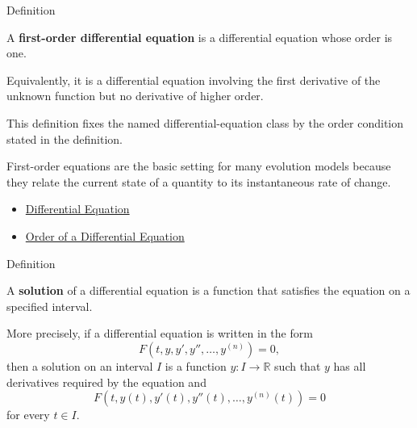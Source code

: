 
\begin{definitionbox}{Definition}
\begin{definition}
\label{def:ordinary-differential-equations-terminology-first-order-differential-equation}
A \textbf{first-order differential equation} is a differential equation whose
order is one.

Equivalently, it is a differential equation involving the first derivative of
the unknown function but no derivative of higher order.
\end{definition}
\end{definitionbox}

\begin{remark*}
This definition fixes the named differential-equation class by the order
condition stated in the definition.
\end{remark*}

\begin{remark*}[Interpretation]
First-order equations are the basic setting for many evolution models because
they relate the current state of a quantity to its instantaneous rate of
change.
\end{remark*}

\begin{dependencies}
\begin{itemize}
  \item \hyperref[def:ordinary-differential-equations-terminology-differential-equation]{Differential Equation}
  \item \hyperref[def:ordinary-differential-equations-terminology-order-of-a-differential-equation]{Order of a Differential Equation}
\end{itemize}
\end{dependencies}


\begin{definitionbox}{Definition}
\begin{definition}
\label{def:ordinary-differential-equations-terminology-solution-of-a-differential-equation}
A \textbf{solution} of a differential equation is a function that satisfies the equation on a specified interval.

More precisely, if a differential equation is written in the form
\[
F(t,y,y',y'',\dots,y^{(n)})=0,
\]
then a solution on an interval $I$ is a function $y:I\to\mathbb{R}$ such that $y$ has all derivatives required by the equation and
\[
F(t,y(t),y'(t),y''(t),\dots,y^{(n)}(t))=0
\]
for every $t\in I$.
\end{definition}
\end{definitionbox}

